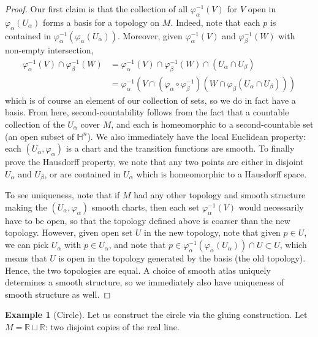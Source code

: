 \documentclass[aps,pra,showpacs,notitlepage,onecolumn,superscriptaddress,nofootinbib]{revtex4-1}
\theoremstyle{definition}
\newtheorem{example}{Example}[section]
\begin{document}
\begin{proof}
 Our first claim is that the collection of all $\varphi_{\alpha}^{-1}(V)$ for $V$ open in $\varphi_{\alpha}(U_{\alpha})$ forms a basis for a topology on $M$. Indeed, note that each $p$ is
 contained in $\varphi_{\alpha}^{-1}(\varphi_{\alpha}(U_{\alpha}))$. Moreover, given $\varphi_{\alpha}^{-1}(V)$ and $\varphi_{\beta}^{-1}(W)$ with non-empty intersection,
 \begin{align}
   \varphi_{\alpha}^{-1}(V) \cap \varphi_{\beta}^{-1}(W) &= \varphi_{\alpha}^{-1}(V) \cap \varphi_{\beta}^{-1}(W) \cap (U_{\alpha} \cap U_{\beta})
   \\ &= \varphi_{\alpha}^{-1}\left( V \cap (\varphi_{\alpha} \circ \varphi_{\beta}^{-1})(W \cap \varphi_{\beta}(U_{\alpha} \cap U_{\beta})) \right)
   \end{align}
 which is of course an element of our collection of sets, so we do in fact have a basis. From here, second-countability follows from the fact that a countable collection of the $U_{\alpha}$ cover $M$, and
 each is homeomorphic to a second-countable set (an open subset of $\mathbb{H}^n$). We also immediately have the local Euclidean property: each $(U_{\alpha}, \varphi_{\alpha})$ is a chart and the transition
 functions are smooth. To finally prove the Hausdorff property, we note that any two points are either in disjoint $U_{\alpha}$ and $U_{\beta}$, or are contained in $U_{\alpha}$ which is homeomorphic to a Hausdorff space.

 To see uniqueness, note that if $M$ had any other topology and smooth structure making the $(U_{\alpha}, \varphi_{\alpha})$ smooth charts, then each set $\varphi_{\alpha}^{-1}(V)$ would necessarily have
 to be open, so that the topology defined above is coarser than the new topology. However, given open set $U$ in the new topology, note that given $p \in U$, we can pick $U_{\alpha}$ with $p \in U_{\alpha}$, and note that
 $p \in \varphi_{\alpha}^{-1}(\varphi_{\alpha}(U_{\alpha})) \cap U \subset U$, which means that $U$ is open in the topology generated by the basis (the old topology). Hence, the two topologies are equal. A choice
 of smooth atlas uniquely determines a smooth structure, so we immediately also have uniqueness of smooth structure as well.
  \end{proof}

\begin{example}[Circle]
  Let us construct the circle via the gluing construction. Let $M = \mathbb{R} \sqcup \mathbb{R}$: two disjoint copies of the real line.
  \end{example}
\end{document}
